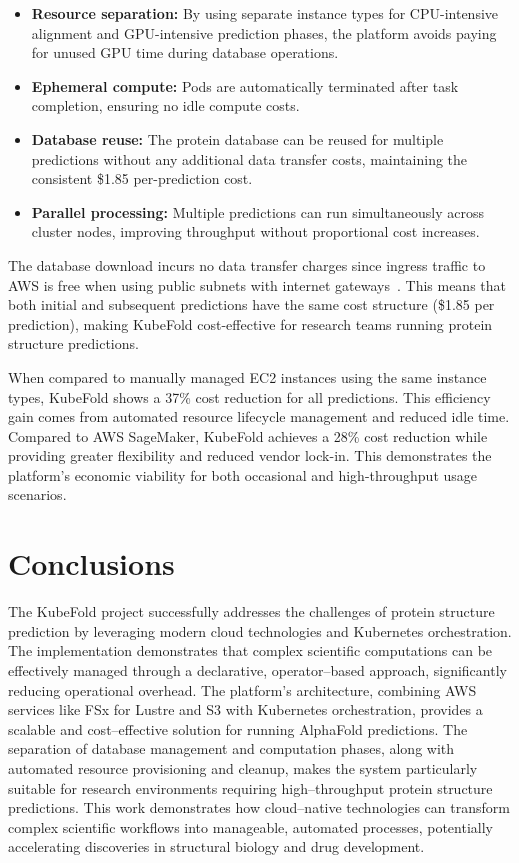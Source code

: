 \begin{itemize}
    \item \textbf{Resource separation:} By using separate instance types for CPU-intensive alignment and GPU-intensive prediction phases, the platform avoids paying for unused GPU time during database operations.
    
    \item \textbf{Ephemeral compute:} Pods are automatically terminated after task completion, ensuring no idle compute costs.
    
    \item \textbf{Database reuse:} The protein database can be reused for multiple predictions without any additional data transfer costs, maintaining the consistent \$1.85 per-prediction cost.
    
    \item \textbf{Parallel processing:} Multiple predictions can run simultaneously across cluster nodes, improving throughput without proportional cost increases.
\end{itemize}

The database download incurs no data transfer charges since ingress traffic to AWS is free when using public subnets with internet gateways~\cite{aws-ec2-pricing}. This means that both initial and subsequent predictions have the same cost structure (\$1.85 per prediction), making KubeFold cost-effective for research teams running protein structure predictions.

When compared to manually managed EC2 instances using the same instance types, KubeFold shows a 37\% cost reduction for all predictions. This efficiency gain comes from automated resource lifecycle management and reduced idle time. Compared to AWS SageMaker, KubeFold achieves a 28\% cost reduction while providing greater flexibility and reduced vendor lock-in. This demonstrates the platform's economic viability for both occasional and high-throughput usage scenarios.

\section{Conclusions}

The KubeFold project successfully addresses the challenges of protein structure prediction by leveraging modern cloud technologies and Kubernetes orchestration.
The implementation demonstrates that complex scientific computations can be effectively managed through a declarative, operator--based approach, significantly reducing operational overhead.
The platform's architecture, combining AWS services like FSx for Lustre and S3 with Kubernetes orchestration, provides a scalable and cost--effective solution for running AlphaFold predictions.
The separation of database management and computation phases, along with automated resource provisioning and cleanup, makes the system particularly suitable for research environments requiring high--throughput protein structure predictions.
This work demonstrates how cloud--native technologies can transform complex scientific workflows into manageable, automated processes, potentially accelerating discoveries in structural biology and drug development.